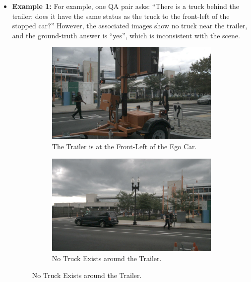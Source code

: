 \documentclass{article} %
\begin{document}
\begin{itemize}
    \item \textbf{Example 1:} 
    For example, one QA pair asks: “There is a truck behind the trailer; does it have the same status as the truck to the front-left of the stopped car?” However, the associated images show no truck near the trailer, and the ground-truth answer is “yes”, which is inconsistent with the scene.

\begin{figure}[H]
    \centering
    \begin{subfigure}[t]{0.3\textwidth}
        \includegraphics[width=\linewidth]{Figures/exam1_front_left_trailer.png}
        \caption{\small The Trailer is at the Front-Left of the Ego Car.}
    \end{subfigure}
    \hfill
    \begin{subfigure}[t]{0.3\textwidth}
        \includegraphics[width=\linewidth]{Figures/exam1_back_left_trailer.png}
        \caption{\small No Truck Exists around the Trailer.}
    \end{subfigure}
    \hfill

\end{figure}
\end{itemize}
\end{document}
